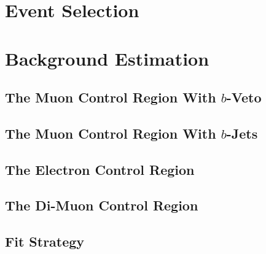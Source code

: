\documentclass[10pt,twoside,cucitura,classica,english,openany]{toptesi}
\begin{document}


\section{Event Selection}
\label{sec:event-selection-1}




% 

\section{Background Estimation}
\label{sec:backgr-estim}



\subsection{The Muon Control Region With $b$-Veto}
\label{sec:muon-cr-bveto}



\subsection{The Muon Control Region With $b$-Jets}
\label{sec:muon-cr-bjet}



\subsection{The Electron Control Region}
\label{sec:ele-cr}



\subsection{The Di-Muon Control Region}
\label{sec:dimuon-cr}



\subsection{Fit Strategy}
\label{sec:fit-strategy}
\end{document}
